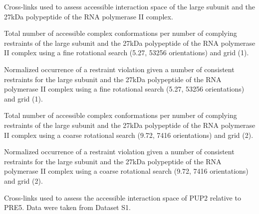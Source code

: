 \caption{}
{Cross-links used to assess accessible interaction space of the large subunit
and the 27kDa polypeptide of the RNA polymerase II complex.}
\stopbuffer


\stopbuffer


\caption{}
{Total number of accessible complex conformations per number of complying
restraints of the large subunit and the 27kDa polypeptide of the RNA polymerase
II complex using a fine rotational search (5.27\Deg, 53256 orientations) and
grid (1\Angstrom).} 
\stopbuffer


\stopbuffer


\caption{}
{Normalized occurrence of a restraint violation given a number of consistent
restraints for the large subunit and the 27kDa polypeptide of the RNA
polymerase II complex using a fine rotational search (5.27\Deg, 53256
orientations) and grid (1\Angstrom).}
\stopbuffer


\stopbuffer

\caption{}
{Total number of accessible complex conformations per number of complying
restraints of the large subunit and the 27kDa polypeptide of the RNA polymerase
II complex using a coarse rotational search (9.72\Deg, 7416 orientations) and
grid (2\Angstrom).} 
\stopbuffer


\stopbuffer


\caption{}
{Normalized occurrence of a restraint violation given a number of consistent
restraints for the large subunit and the 27kDa polypeptide of the RNA
polymerase II complex using a coarse rotational search (9.72\Deg, 7416
orientations) and grid (2\Angstrom).}
\stopbuffer


\stopbuffer

\caption{}
{Cross-links used to assess the accessible interaction space of PUP2 relative
to PRE5. Data were taken from \citeauthor{Leitner2014} Dataset S1.}
\stopbuffer

